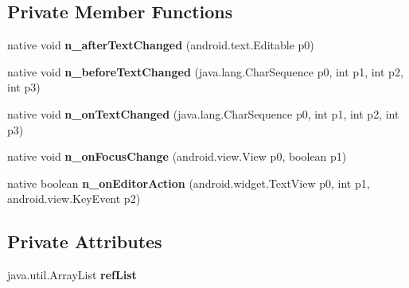\subsection*{Private Member Functions}
\begin{DoxyCompactItemize}
\item 
\mbox{\label{classmd5b60ffeb829f638581ab2bb9b1a7f4f3f_1_1EntryCellView_ae7edff3f42c61efac2657a90a7cf0456}} 
native void {\bfseries n\+\_\+after\+Text\+Changed} (android.\+text.\+Editable p0)
\item 
\mbox{\label{classmd5b60ffeb829f638581ab2bb9b1a7f4f3f_1_1EntryCellView_a34d243c449e7bc60206e9b8d88e03613}} 
native void {\bfseries n\+\_\+before\+Text\+Changed} (java.\+lang.\+Char\+Sequence p0, int p1, int p2, int p3)
\item 
\mbox{\label{classmd5b60ffeb829f638581ab2bb9b1a7f4f3f_1_1EntryCellView_adb254e0b3f357d3371ec0461e12da0b2}} 
native void {\bfseries n\+\_\+on\+Text\+Changed} (java.\+lang.\+Char\+Sequence p0, int p1, int p2, int p3)
\item 
\mbox{\label{classmd5b60ffeb829f638581ab2bb9b1a7f4f3f_1_1EntryCellView_ab98a6bd62810173fd88534cb64ea87df}} 
native void {\bfseries n\+\_\+on\+Focus\+Change} (android.\+view.\+View p0, boolean p1)
\item 
\mbox{\label{classmd5b60ffeb829f638581ab2bb9b1a7f4f3f_1_1EntryCellView_ad39763bac685bdb01bc26ba3eedca6aa}} 
native boolean {\bfseries n\+\_\+on\+Editor\+Action} (android.\+widget.\+Text\+View p0, int p1, android.\+view.\+Key\+Event p2)
\end{DoxyCompactItemize}
\subsection*{Private Attributes}
\begin{DoxyCompactItemize}
\item 
\mbox{\label{classmd5b60ffeb829f638581ab2bb9b1a7f4f3f_1_1EntryCellView_a7768036a1df03e5a8aa5d75e1c5de7f6}} 
java.\+util.\+Array\+List {\bfseries ref\+List}
\end{DoxyCompactItemize}


